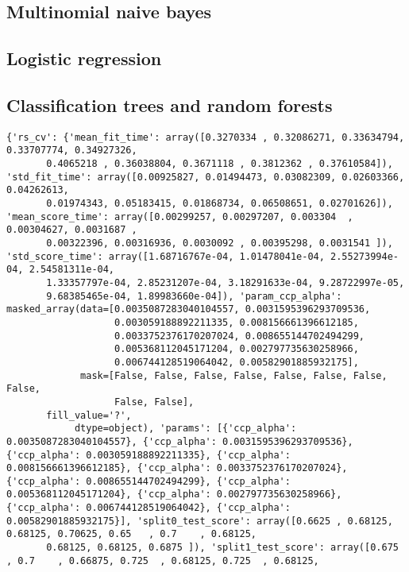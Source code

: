 \documentclass[11pt]{article}
\begin{document}
\subsection{Multinomial naive bayes}
\label{sec:orgfc8f09b}

\subsection{Logistic regression}
\label{sec:orgca0423c}

\subsection{Classification trees and random forests}
\label{sec:orgd2d5172}

\begin{verbatim}
{'rs_cv': {'mean_fit_time': array([0.3270334 , 0.32086271, 0.33634794, 0.33707774, 0.34927326,
       0.4065218 , 0.36038804, 0.3671118 , 0.3812362 , 0.37610584]), 'std_fit_time': array([0.00925827, 0.01494473, 0.03082309, 0.02603366, 0.04262613,
       0.01974343, 0.05183415, 0.01868734, 0.06508651, 0.02701626]), 'mean_score_time': array([0.00299257, 0.00297207, 0.003304  , 0.00304627, 0.0031687 ,
       0.00322396, 0.00316936, 0.0030092 , 0.00395298, 0.0031541 ]), 'std_score_time': array([1.68716767e-04, 1.01478041e-04, 2.55273994e-04, 2.54581311e-04,
       1.33357797e-04, 2.85231207e-04, 3.18291633e-04, 9.28722997e-05,
       9.68385465e-04, 1.89983660e-04]), 'param_ccp_alpha': masked_array(data=[0.0035087283040104557, 0.0031595396293709536,
                   0.003059188892211335, 0.008156661396612185,
                   0.0033752376170207024, 0.008655144702494299,
                   0.005368112045171204, 0.002797735630258966,
                   0.006744128519064042, 0.00582901885932175],
             mask=[False, False, False, False, False, False, False, False,
                   False, False],
       fill_value='?',
            dtype=object), 'params': [{'ccp_alpha': 0.0035087283040104557}, {'ccp_alpha': 0.0031595396293709536}, {'ccp_alpha': 0.003059188892211335}, {'ccp_alpha': 0.008156661396612185}, {'ccp_alpha': 0.0033752376170207024}, {'ccp_alpha': 0.008655144702494299}, {'ccp_alpha': 0.005368112045171204}, {'ccp_alpha': 0.002797735630258966}, {'ccp_alpha': 0.006744128519064042}, {'ccp_alpha': 0.00582901885932175}], 'split0_test_score': array([0.6625 , 0.68125, 0.68125, 0.70625, 0.65   , 0.7    , 0.68125,
       0.68125, 0.68125, 0.6875 ]), 'split1_test_score': array([0.675  , 0.7    , 0.66875, 0.725  , 0.68125, 0.725  , 0.68125,

\end{verbatim}
\end{document}
